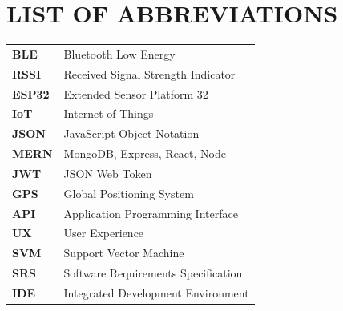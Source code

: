 \chapter*{LIST OF ABBREVIATIONS}

\begin{longtable}{ll}
\textbf{BLE} & Bluetooth Low Energy \\
\textbf{RSSI} & Received Signal Strength Indicator \\
\textbf{ESP32} & Extended Sensor Platform 32 \\
\textbf{IoT} & Internet of Things \\
\textbf{JSON} & JavaScript Object Notation \\
\textbf{MERN} & MongoDB, Express, React, Node \\
\textbf{JWT} & JSON Web Token \\
\textbf{GPS} & Global Positioning System \\
\textbf{API} & Application Programming Interface \\
\textbf{UX} & User Experience \\
\textbf{SVM} & Support Vector Machine \\
\textbf{SRS} & Software Requirements Specification \\
\textbf{IDE} & Integrated Development Environment \\
\end{longtable}
